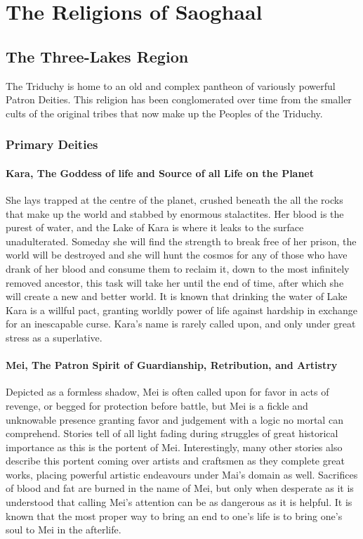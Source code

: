 \section{The Religions of Saoghaal}
\subsection{The Three-Lakes Region}
The Triduchy is home to an old and complex pantheon of variously powerful Patron Deities. 
This religion has been conglomerated over time from the smaller cults of the original tribes that now make up the Peoples of the Triduchy.

\subsubsection{Primary Deities}

\paragraph{Kara, The Goddess of life and Source of all Life on the Planet}
She lays trapped at the centre of the planet, crushed beneath the all the rocks that make up the world and stabbed by enormous stalactites. Her blood is the purest of water, and the Lake of Kara is where it leaks to the surface unadulterated. Someday she will find the strength to break free of her prison, the world will be destroyed and she will hunt the cosmos for any of those who have drank of her blood and consume them to reclaim it, down to the most infinitely removed ancestor, this task will take her until the end of time, after which she will create a new and better world. It is known that drinking the water of Lake Kara is a willful pact, granting worldly power of life against hardship in exchange for an inescapable curse. Kara’s name is rarely called upon, and only under great stress as a superlative.

\paragraph{Mei, The Patron Spirit of Guardianship, Retribution, and Artistry}
Depicted as a formless shadow, Mei is often called upon for favor in acts of revenge, or begged for protection before battle, but Mei is a fickle and unknowable presence granting favor and judgement with a logic no mortal can comprehend. Stories tell of all light fading during struggles of great historical importance as this is the portent of Mei. Interestingly, many other stories also describe this portent coming over artists and craftsmen as they complete great works, placing powerful artistic endeavours under Mai’s domain as well. Sacrifices of blood and fat are burned in the name of Mei, but only when desperate as it is understood that calling Mei’s attention can be as dangerous as it is helpful. It is known that the most proper way to bring an end to one’s life is to bring one’s soul to Mei in the afterlife.

